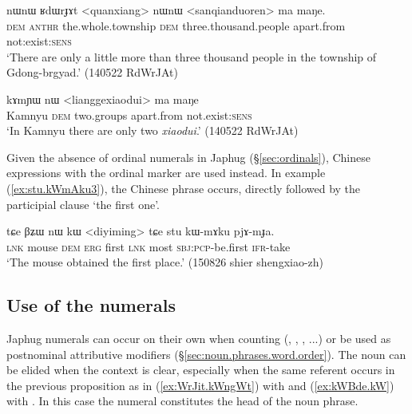 \begin{exe}
\ex \label{ex:quanxiang}
\gll nɯnɯ ʁdɯrɟɤt <quanxiang> nɯnɯ <sanqianduoren> ma maŋe. \\
 \textsc{dem}  \textsc{anthr} the.whole.township \textsc{dem} three.thousand.people apart.from not:exist:\textsc{sens} \\
\glt  `There are only a little more than three thousand people in the township of Gdong-brgyad.' (140522 RdWrJAt)
\end{exe}
 \largerpage
\begin{exe}
\ex \label{ex:liangge}
\gll  kɤmɲɯ nɯ <lianggexiaodui> ma maŋe \\
 Kamnyu \textsc{dem} two.groups apart.from not.exist:\textsc{sens} \\
\glt `In Kamnyu there are only two \textit{xiaodui}.' (140522 RdWrJAt) 
\end{exe} 


Given the absence of ordinal numerals in Japhug (§\ref{sec:ordinals}), Chinese expressions with the ordinal marker   are used instead. In example (\ref{ex:stu.kWmAku3}), the Chinese phrase  occurs, directly followed by the participial clause  `the first one'.

\begin{exe}
	\ex  \label{ex:stu.kWmAku3}
	\gll tɕe βʑɯ nɯ kɯ <diyiming> tɕe stu kɯ-mɤku pjɤ-mɟa. \\
	\textsc{lnk} mouse \textsc{dem} \textsc{erg} first \textsc{lnk} most \textsc{sbj}:\textsc{pcp}-be.first \textsc{ifr}-take \\
	\glt `The mouse obtained the first place.' (150826 shier shengxiao-zh)
\end{exe}

 \subsection{Use of the numerals}  \label{sec:uses.numerals}
 Japhug numerals can occur on their own when counting (, , , ...) or be used as postnominal attributive modifiers (§\ref{sec:noun.phrases.word.order}). The noun can be elided when the context is clear, especially when the same referent occurs in the previous proposition as in (\ref{ex:WrJit.kWngWt})  with  and (\ref{ex:kWBde.kW}) with . In this case the numeral constitutes the head of the noun phrase.


